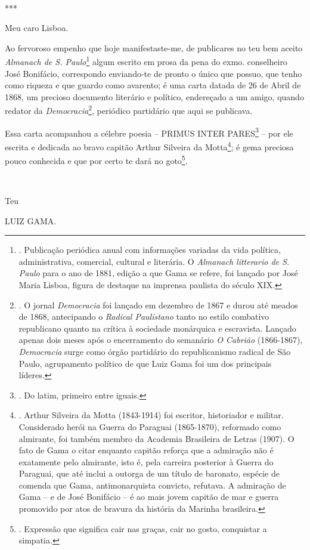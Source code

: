 ~

***

Meu caro Lisboa.

Ao fervoroso empenho que hoje manifestaste-me, de publicares no teu bem
aceito \emph{Almanach de S. Paulo}\footnote{. Publicação periódica anual
  com informações variadas da vida política, administrativa, comercial,
  cultural e literária. O \emph{Almanach litterario de S. Paulo} para o
  ano de 1881, edição a que Gama se refere, foi lançado por José Maria
  Lisboa, figura de destaque na imprensa paulista do século XIX.} algum
escrito em prosa da pena do exmo. conselheiro José Bonifácio,
correspondo enviando-te de pronto o único que possuo, que tenho como
riqueza e que guardo como avarento; é uma carta datada de 26 de Abril de
1868, um precioso documento literário e político, endereçado a um amigo,
quando redator da \emph{Democracia}\footnote{. O jornal
  \emph{Democracia} foi lançado em dezembro de 1867 e durou até meados
  de 1868, antecipando o \emph{Radical Paulistano} tanto no estilo
  combativo republicano quanto na crítica à sociedade monárquica e
  escravista. Lançado apenas dois meses após o encerramento do semanário
  \emph{O Cabrião} (1866-1867), \emph{Democracia} surge como órgão
  partidário do republicanismo radical de São Paulo, agrupamento
  político de que Luiz Gama foi um dos principais líderes.}, periódico
partidário que aqui se publicava.

Essa carta acompanhou a célebre poesia -- PRIMUS INTER PARES\footnote{.
  Do latim, primeiro entre iguais.} -- por ele escrita e dedicada ao
bravo capitão Arthur Silveira da Motta\footnote{. Arthur Silveira da
  Motta (1843-1914) foi escritor, historiador e militar. Considerado
  herói na Guerra do Paraguai (1865-1870), reformado como almirante, foi
  também membro da Academia Brasileira de Letras (1907). O fato de Gama
  o citar enquanto capitão reforça que a admiração não é exatamente pelo
  almirante, isto é, pela carreira posterior à Guerra do Paraguai, que
  até inclui a outorga de um título de baronato, espécie de comenda que
  Gama, antimonarquista convicto, refutava. A admiração de Gama -- e de
  José Bonifácio -- é ao mais jovem capitão de mar e guerra promovido
  por atos de bravura da história da Marinha brasileira.}; é gema
preciosa pouco conhecida e que por certo te dará no goto\footnote{.
  Expressão que significa cair nas graças, cair no gosto, conquistar a
  simpatia.}.

~

Teu

LUIZ GAMA.


